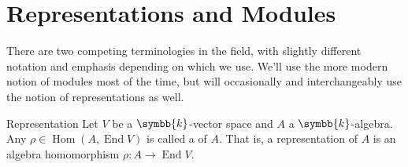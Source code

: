 \documentclass[fleqn]{NotesClass}
\renewcommand{\field}{\symbb{k}}
\DeclareMathOperator{\End}{End}
\DeclareMathOperator{\Hom}{Hom}
\begin{document}
    \section{Representations and Modules}
    There are two competing terminologies in the field, with slightly different notation and emphasis depending on which we use.
    We'll use the more modern notion of modules most of the time, but will occasionally and interchangeably use the notion of representations as well.
    
    \begin{dfn}{Representation}{}
        Let \(V\) be a \(\field\)-vector space and \(A\) a \(\field\)-algebra.
        Any \(\rho \in \Hom(A, \End V)\) is called a  of \(A\).
        That is, a representation of \(A\) is an algebra homomorphism \(\rho \colon A \to \End V\).
    \end{dfn}
    
\end{document}
